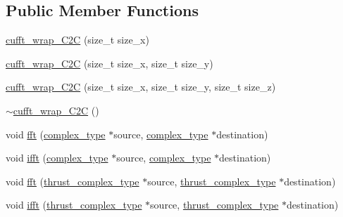 \subsection*{Public Member Functions}
\begin{DoxyCompactItemize}
\item 
\hyperlink{classcufft__wrap__C2C_3_01double_01_4_afed914539a98a9f9be66a12d1164004a}{cufft\-\_\-wrap\-\_\-\-C2\-C} (size\-\_\-t size\-\_\-x)
\item 
\hyperlink{classcufft__wrap__C2C_3_01double_01_4_a164ced373f7db5b0c5780d5074aac1c7}{cufft\-\_\-wrap\-\_\-\-C2\-C} (size\-\_\-t size\-\_\-x, size\-\_\-t size\-\_\-y)
\item 
\hyperlink{classcufft__wrap__C2C_3_01double_01_4_a740395e645ee7e895af9d4c398b95dab}{cufft\-\_\-wrap\-\_\-\-C2\-C} (size\-\_\-t size\-\_\-x, size\-\_\-t size\-\_\-y, size\-\_\-t size\-\_\-z)
\item 
\hyperlink{classcufft__wrap__C2C_3_01double_01_4_aa12febcc3456df320d0a90bfa8a0b5ac}{$\sim$cufft\-\_\-wrap\-\_\-\-C2\-C} ()
\item 
void \hyperlink{classcufft__wrap__C2C_3_01double_01_4_a42a3a8069c280e2bdeaf48e95d5f6633}{fft} (\hyperlink{classcufft__wrap__C2C_3_01double_01_4_a6813a47168c043bdbf7ca39cb44e16ca}{complex\-\_\-type} $\ast$source, \hyperlink{classcufft__wrap__C2C_3_01double_01_4_a6813a47168c043bdbf7ca39cb44e16ca}{complex\-\_\-type} $\ast$destination)
\item 
void \hyperlink{classcufft__wrap__C2C_3_01double_01_4_ae78df5a6bd2691d1f989c172e6704c1f}{ifft} (\hyperlink{classcufft__wrap__C2C_3_01double_01_4_a6813a47168c043bdbf7ca39cb44e16ca}{complex\-\_\-type} $\ast$source, \hyperlink{classcufft__wrap__C2C_3_01double_01_4_a6813a47168c043bdbf7ca39cb44e16ca}{complex\-\_\-type} $\ast$destination)
\item 
void \hyperlink{classcufft__wrap__C2C_3_01double_01_4_ad1883462f3e8f5391a3b2448e51759d4}{fft} (\hyperlink{classcufft__wrap__C2C_3_01double_01_4_a61adb083b7093ac3b77aea1e52f85107}{thrust\-\_\-complex\-\_\-type} $\ast$source, \hyperlink{classcufft__wrap__C2C_3_01double_01_4_a61adb083b7093ac3b77aea1e52f85107}{thrust\-\_\-complex\-\_\-type} $\ast$destination)
\item 
void \hyperlink{classcufft__wrap__C2C_3_01double_01_4_a5ee7b7f4ab06c8767dc245fae9a1f2bf}{ifft} (\hyperlink{classcufft__wrap__C2C_3_01double_01_4_a61adb083b7093ac3b77aea1e52f85107}{thrust\-\_\-complex\-\_\-type} $\ast$source, \hyperlink{classcufft__wrap__C2C_3_01double_01_4_a61adb083b7093ac3b77aea1e52f85107}{thrust\-\_\-complex\-\_\-type} $\ast$destination)
\end{DoxyCompactItemize}


